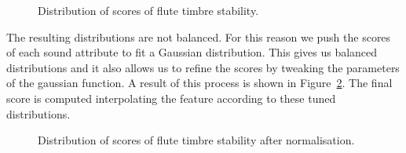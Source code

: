 \documentclass{article}
\begin{document}
\begin{figure}[ht]
 \centerline{}
 \caption{Distribution of scores of flute timbre stability.}
 \label{fig:scores}
\end{figure}

The resulting distributions are not balanced. For this reason we push the scores of each sound attribute to fit a Gaussian distribution. This gives us balanced distributions and it also allows us to refine the scores by tweaking the parameters of the gaussian function. A result of this process is shown in Figure~\ref{fig:scores_2}. The final score is computed interpolating the feature according to these tuned distributions. 

\begin{figure}[ht]
 \centerline{}
 \caption{Distribution of scores of flute timbre stability after normalisation.}
 \label{fig:scores_2}
\end{figure}
\end{document}
